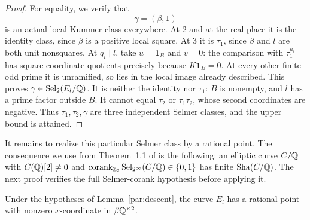 \begin{proof}
For equality, we verify that
\[
 \gamma=(\beta,1)
\]
is an actual local Kummer class everywhere. At $2$ and at the real
place it is the identity class, since $\beta$ is a positive local
square. At $3$ it is $\tau_1$, since $\beta$ and $l$ are both
unit nonsquares. At $q_i\mid l$, take $u=\mathbf1_B$ and $v=0$:
the comparison with $\tau_1^{u_i}$ has square coordinate quotients
precisely because $K\mathbf1_B=0$. At every other finite odd
prime it is unramified, so lies in the local image already
described. This proves $\gamma\in\operatorname{Sel}_2(E_l/\mathbb Q)$.
It is neither the identity nor $\tau_1$: $B$ is nonempty, and
$l$ has a prime factor outside $B$. It cannot equal $\tau_2$ or
$\tau_1\tau_2$, whose second coordinates are negative. Thus
$\tau_1,\tau_2,\gamma$ are three independent Selmer classes,
and the upper bound is attained.
\end{proof}


It remains to realize this particular Selmer class by a rational point.
The consequence we use from Theorem~1.1 of \cite{PointwiseTwoConverse}
is the following: an elliptic curve $C/\mathbb Q$ with $C(\mathbb Q)[2]\ne0$ and
$\operatorname{corank}_{\mathbb Z_2}\operatorname{Sel}_{2^\infty}(C/\mathbb Q)\in\{0,1\}$ has finite
$\mathop{\mathrm{Sha}}(C/\mathbb Q)$. The next proof verifies the full Selmer-corank hypothesis
before applying it.

\begin{lemma}\label{par:global-point}
Under the hypotheses of Lemma~\ref{par:descent}, the curve $E_l$
has a rational point with nonzero $x$-coordinate in
$\beta\mathbb Q^{\times2}$.
\end{lemma}

